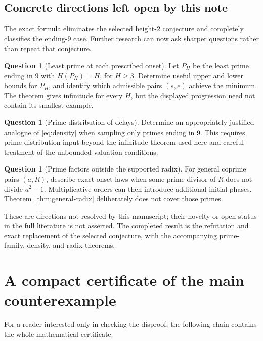 \documentclass[11pt,letterpaper]{article}
\numberwithin{equation}{section}
\theoremstyle{definition}
\newtheorem{question}[theorem]{Question}
\theoremstyle{remark}
\begin{document}
\subsection{Concrete directions left open by this note}

The exact formula eliminates the selected height-2 conjecture and completely classifies the ending-9 case. Further research can now ask sharper questions rather than repeat that conjecture.

\begin{question}[Least prime at each prescribed onset]
Let $P_H$ be the least prime ending in 9 with $H(P_H)=H$, for $H\ge3$. Determine useful upper and lower bounds for $P_H$, and identify which admissible pairs $(s,e)$ achieve the minimum. The theorem gives infinitude for every $H$, but the displayed progression need not contain its smallest example.
\end{question}

\begin{question}[Prime distribution of delays]
Determine an appropriately justified analogue of \eqref{eq:density} when sampling only primes ending in 9. This requires prime-distribution input beyond the infinitude theorem used here and careful treatment of the unbounded valuation conditions.
\end{question}

\begin{question}[Prime factors outside the supported radix]
For general coprime pairs $(a,R)$, describe exact onset laws when some prime divisor of $R$ does not divide $a^2-1$. Multiplicative orders can then introduce additional initial phases. Theorem~\ref{thm:general-radix} deliberately does not cover those primes.
\end{question}

These are directions not resolved by this manuscript; their novelty or open status in the full literature is not asserted. The completed result is the refutation and exact replacement of the selected conjecture, with the accompanying prime-family, density, and radix theorems.

\appendix
\section{A compact certificate of the main counterexample}\label{app:certificate}

For a reader interested only in checking the disproof, the following chain contains the whole mathematical certificate.
\end{document}
